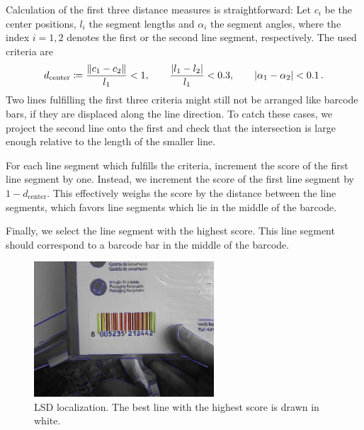 Calculation of the first three distance measures is straightforward: Let $c_i$
be the center positions, $l_i$ the segment lengths and $\alpha_i$ the segment angles, where the index $i=1,2$
denotes the first or the second line segment, respectively. The used criteria are
\begin{equation*}
d_{\text{center}}\coloneqq\frac{\lVert c_1-c_2\rVert}{l_1}<1,\qquad \frac{\lvert l_1-l_2\rvert}{l_1}<0.3,\qquad \lvert\alpha_1-\alpha_2\rvert<0.1\,.
\end{equation*}
Two lines fulfilling the first three criteria might still not be arranged like
barcode bars, if they are displaced along the line direction. To catch these
cases, we project the second line onto the first and check that the intersection
is large enough relative to the length of the smaller line.

For each line segment which fulfills the criteria, \citeauthor{Creusot2016}
increment the score of the first line segment by one. Instead, we increment the score of the
first line segment by $1-d_{\text{center}}$. This effectively weighs the score by the distance
between the line segments, which favors line segments which lie in
the middle of the barcode.

Finally, we select the line segment with the highest score. This line segment
should correspond to a barcode bar in the middle of the barcode.
\begin{figure}[t]
\center
\includegraphics[width=0.6\textwidth,natwidth=800,natheight=600]{img/lsd.jpg}
\caption{LSD localization. The best line with the highest score is drawn in white.}
\label{lsd}
\end{figure}

